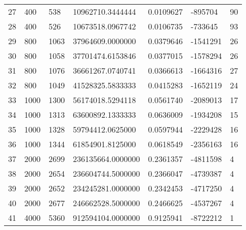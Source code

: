 \begin{longtable}{lllllll}
    27               & 400            & 538            & 10962710.3444444      & 0.0109627        & -895704         & 90                   \\
    28               & 400            & 526            & 10673518.0967742      & 0.0106735        & -733645         & 93                   \\
    29               & 800            & 1063           & 37964609.0000000      & 0.0379646        & -1541291        & 26                   \\
    30               & 800            & 1058           & 37701474.6153846      & 0.0377015        & -1578294        & 26                   \\
    31               & 800            & 1076           & 36661267.0740741      & 0.0366613        & -1664316        & 27                   \\
    32               & 800            & 1049           & 41528325.5833333      & 0.0415283        & -1652119        & 24                   \\
    33               & 1000           & 1300           & 56174018.5294118      & 0.0561740        & -2089013        & 17                   \\
    34               & 1000           & 1313           & 63600892.1333333      & 0.0636009        & -1934208        & 15                   \\
    35               & 1000           & 1328           & 59794412.0625000      & 0.0597944        & -2229428        & 16                   \\
    36               & 1000           & 1344           & 61854901.8125000      & 0.0618549        & -2356163        & 16                   \\
    37               & 2000           & 2699           & 236135664.0000000     & 0.2361357        & -4811598        & 4                    \\
    38               & 2000           & 2654           & 236604744.5000000     & 0.2366047        & -4739387        & 4                    \\
    39               & 2000           & 2652           & 234245281.0000000     & 0.2342453        & -4717250        & 4                    \\
    40               & 2000           & 2677           & 246662528.5000000     & 0.2466625        & -4537267        & 4                    \\
    41               & 4000           & 5360           & 912594104.0000000     & 0.9125941        & -8722212        & 1                    \\

\end{longtable}
